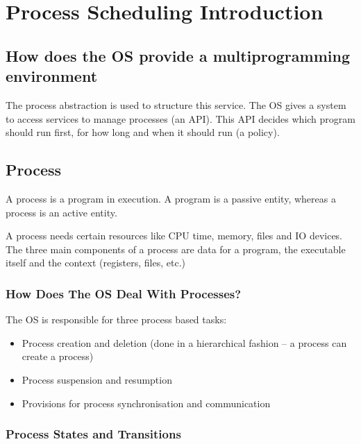 \section{Process Scheduling Introduction}\label{sec:process_scheduling_introduction}

\subsection{How does the OS provide a multiprogramming environment}\label{sub:how_does_the_os_provide_a_multiprogramming_environment}

The process abstraction is used to structure this service.
The OS gives a system to access services to manage processes (an API).
This API decides which program should run first, for how long and when it should run (a policy).

\subsection{Process}\label{sub:process}

A process is a program in execution.
A program is a passive entity, whereas a process is an active entity.

A process needs certain resources like CPU time, memory, files and IO devices.
The three main components of a process are data for a program, the executable itself and the context (registers, files, etc.)

\subsubsection{How Does The OS Deal With Processes?}\label{ssub:how_does_the_os_deal_with_processes}

The OS is responsible for three process based tasks:
\begin{itemize}
	\item Process creation and deletion (done in a hierarchical fashion -- a process can create a process)
	\item Process suspension and resumption
	\item Provisions for process synchronisation and communication
\end{itemize}

\subsubsection{Process States and Transitions}\label{ssub:process_states_and_transitions}

